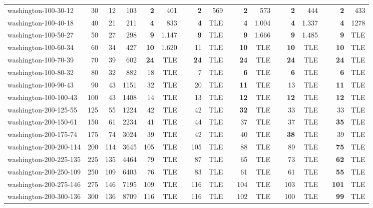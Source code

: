 \begin{table}[!ht]
{\begin{tabular}{lrrrrrrrrrrrrrrrrr}
washington-100-30-12 & 30 & 12 & 103 & \textbf{2} & 401 &  & \textbf{2} & 569 &  & \textbf{2} & 573 &  & \textbf{2} & 444 &  & \textbf{2} & 433 \\
washington-100-40-18 & 40 & 21 & 211 & \textbf{4} & 833 &  & \textbf{4} & TLE &  & \textbf{4} & 1.004 &  & \textbf{4} & 1.337 &  & \textbf{4} & 1278 \\
washington-100-50-27 & 50 & 27 & 298 & \textbf{9} & 1.147 &  & \textbf{9} & TLE &  & \textbf{9} & 1.666 &  & \textbf{9} & 1.485 &  & \textbf{9} & TLE \\
washington-100-60-34 & 60 & 34 & 427 & \textbf{10} & 1.620 &  & 11 & TLE &  & \textbf{10} & TLE &  & \textbf{10} & TLE &  & \textbf{10} & TLE \\
washington-100-70-39 & 70 & 39 & 602 & \textbf{24} & TLE &  & \textbf{24} & TLE &  & \textbf{24} & TLE &  & \textbf{24} & TLE &  & \textbf{24} & TLE \\
washington-100-80-32 & 80 & 32 & 882 & 18 & TLE &  & 7 & TLE &  & \textbf{6} & TLE &  & \textbf{6} & TLE &  & \textbf{6} & TLE \\
washington-100-90-43 & 90 & 43 & 1151 & 32 & TLE &  & 20 & TLE &  & \textbf{11} & TLE &  & 13 & TLE &  & \textbf{11} & TLE \\
washington-100-100-43 & 100 & 43 & 1408 & 14 & TLE &  & 13 & TLE &  & \textbf{12} & TLE &  & \textbf{12} & TLE &  & \textbf{12} & TLE \\ \hline
washington-200-125-55 & 125 & 55 & 1224 & 42 & TLE &  & 42 & TLE &  & \textbf{32} & TLE &  & 33 & TLE &  & 33 & TLE \\
washington-200-150-61 & 150 & 61 & 2234 & 41 & TLE &  & 44 & TLE &  & 37 & TLE &  & 37 & TLE &  & \textbf{35} & TLE \\
washington-200-175-74 & 175 & 74 & 3024 & 39 & TLE &  & 42 & TLE &  & 40 & TLE &  & \textbf{38} & TLE &  & 39 & TLE \\
washington-200-200-114 & 200 & 114 & 3645 & 105 & TLE &  & 105 & TLE &  & 88 & TLE &  & 89 & TLE &  & \textbf{75} & TLE \\
washington-200-225-135 & 225 & 135 & 4464 & 79 & TLE &  & 87 & TLE &  & 65 & TLE &  & 73 & TLE &  & \textbf{62} & TLE \\
washington-200-250-109 & 250 & 109 & 6403 & 76 & TLE &  & 83 & TLE &  & 61 & TLE &  & 61 & TLE &  & \textbf{55} & TLE \\
washington-200-275-146 & 275 & 146 & 7195 & 109 & TLE &  & 116 & TLE &  & 104 & TLE &  & 103 & TLE &  & \textbf{101} & TLE \\
washington-200-300-136 & 300 & 136 & 8709 & 116 & TLE &  & 116 & TLE &  & 102 & TLE &  & 100 & TLE &  & \textbf{99} & TLE \\

\end{tabular}}
\end{table}
